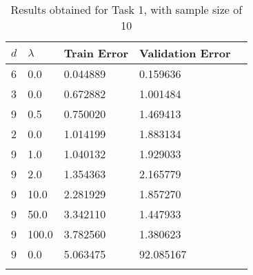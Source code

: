 \def\arraystretch{1.25}
\begin{center}
{\small
\begin{longtable}{l l l l l}
\hline
\hline
\textbf{$d$} & \textbf{$\lambda$} & \textbf{Train Error} & \textbf{Validation Error} \\
\hline
\hline
6 & 0.0 & 0.044889 & 0.159636 \\
3 & 0.0 & 0.672882 & 1.001484 \\
9 & 0.5 & 0.750020 & 1.469413 \\
2 & 0.0 & 1.014199 & 1.883134 \\
9 & 1.0 & 1.040132 & 1.929033 \\
9 & 2.0 & 1.354363 & 2.165779 \\
9 & 10.0 & 2.281929 & 1.857270 \\
9 & 50.0 & 3.342110 & 1.447933 \\
9 & 100.0 & 3.782560 & 1.380623 \\
9 & 0.0 & 5.063475 & 92.085167 \\
\hline
\caption{Results obtained for Task 1, with sample size of 10}
\end{longtable}
}
\end{center}